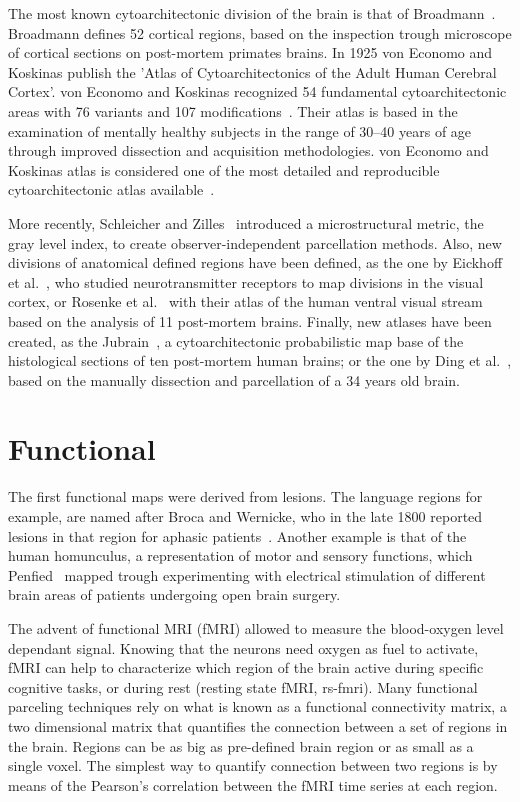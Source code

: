 The most known cytoarchitectonic division of the brain is that of
Broadmann~\cite{Brodmann1909}. Broadmann defines 52 cortical regions, based
on the inspection trough microscope of cortical sections on post-mortem
primates brains. In 1925 von Economo and Koskinas publish
the 'Atlas of Cytoarchitectonics of the Adult Human Cerebral Cortex'\cite{VonEconomo1925}.
von Economo and Koskinas recognized 54 fundamental cytoarchitectonic areas with
76 variants and 107 modifications~\cite{Triarhou2007}. Their atlas is based in the
examination of mentally healthy subjects in the range of 30–40 years of age
through improved dissection and acquisition methodologies. von Economo and 
Koskinas atlas is considered one of the most detailed and reproducible cytoarchitectonic
atlas available~\cite{Peden1947}.

More recently, Schleicher and Zilles~\cite{Schleicher1990} introduced a microstructural
metric, the gray level index, to create observer-independent parcellation methods.
Also, new divisions of anatomical defined regions have been defined, as the one by
Eickhoff et al.~\cite{Eickhoff2008}, who studied neurotransmitter receptors to
map divisions in the visual cortex, or Rosenke et al.~\cite{Rosenke2018} with
their atlas of the human ventral visual stream based on the analysis of 11
post-mortem brains. Finally, new atlases have been created, as the 
Jubrain~\cite{Mohlberg2012}, a cytoarchitectonic probabilistic map base of the
histological sections of ten post-mortem human brains; or the one by
Ding et al.~\cite{Ding2016}, based on the manually dissection and parcellation
of a 34 years old brain.

\section{Functional}
\label{sec:functional}
The first functional maps were derived from lesions. The language regions for
example, are named after Broca and Wernicke, who in the late 1800 reported
lesions in that region for aphasic patients~\cite{Johns}. Another example is
that of the human homunculus, a representation of motor and sensory functions,
which Penfied~\cite{Schleicher1990} mapped trough experimenting with electrical
stimulation of different brain areas of patients undergoing open brain surgery.

The advent of functional MRI (fMRI) allowed to measure the blood-oxygen level
dependant signal. Knowing that the neurons need oxygen as fuel to activate,
fMRI can help to characterize which region of the brain active during specific
cognitive tasks, or during rest (resting state fMRI, rs-fmri). Many functional parceling
techniques rely on what is known as a functional connectivity matrix, a two
dimensional matrix that quantifies the connection between a set of regions
in the brain. Regions can be as big as pre-defined brain region or as small as
a single voxel. The simplest way to quantify connection between two regions is
by means of the Pearson's correlation between the fMRI time series at each region.

